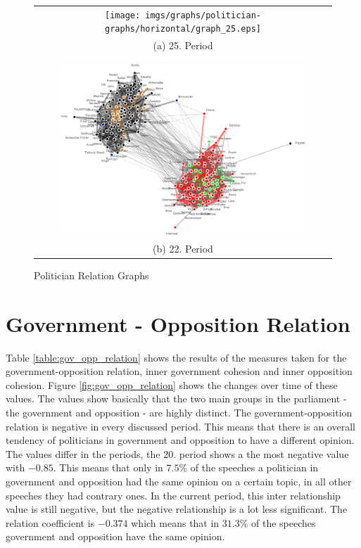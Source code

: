\begin{figure}
\center
\begin{tabular}{ c }
	\texttt{[image: imgs/graphs/politician-graphs/horizontal/graph\_25.eps]}
	\\
	(a) 25. Period
	\\
	\\
	\hline
	\\
	
	\includegraphics[width=0.85\textwidth]{imgs/graphs/politician-graphs/horizontal/graph_22.eps}
	\\
	(b) 22. Period
\end{tabular}
	
	
	\caption{Politician Relation Graphs}
	\label{fig:pol_graphs1}
\end{figure}

\section{Government - Opposition Relation}
\label{sec:gov_opp_relation}
Table \ref{table:gov_opp_relation} shows the results of the measures taken for the government-opposition relation, inner government cohesion and inner opposition cohesion. Figure \ref{fig:gov_opp_relation} shows the changes over time of these values. The values show basically that the two main groups in the parliament - the government and opposition - are highly distinct. The government-opposition relation is negative in every discussed period. This means that there is an overall tendency of politicians in government and opposition to have a different opinion. The values differ in the periods, the 20. period shows a the most negative value with $-0.85$. This means that only in $7.5$\% of the speeches a politician in government and opposition had the same opinion on a certain topic, in all other speeches they had contrary ones. In the current period, this inter relationship value is still negative, but the negative relationship is a lot less significant. The relation coefficient is $-0.374$ which means that in $31.3$\% of the speeches government and opposition have the same opinion.

